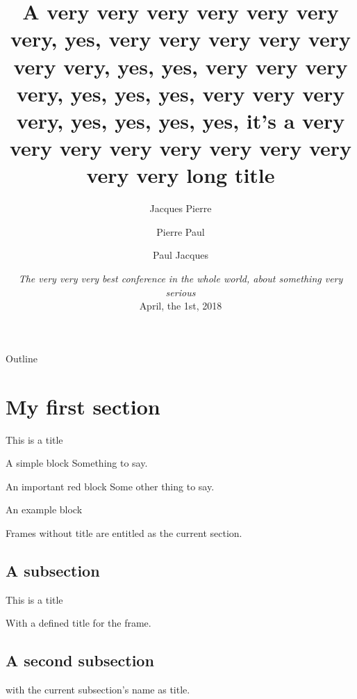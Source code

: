 \documentclass[aspectratio=169]{ISAE-Beamer}
\title[Short title]{A very very very very very very very, yes, very very very very very very very, yes, yes, very very very very, yes, yes, yes, very very very very, yes, yes, yes, yes, it's a very very very very very very very very very very long title}
\institute[ISAE, ONERA]
{\inst{1}ISAE-SUPAERO, Toulouse \and \inst{2}ONERA, Toulouse}
\author[JP, PP, PJ]{Jacques Pierre\inst{1} \and Pierre Paul\inst{2} \and Paul Jacques\inst{2}}
\date[THE Conf, 04/01/18]{\textit{The very very very best conference in the whole world, about something very serious}\\ April, the 1st, 2018}
\begin{document}
\maketitle

\begin{frame}{Outline}

\tableofcontents

\end{frame}

\section{My first section}
\begin{frame}{This is a title}

\begin{block}{A simple block}
Something to say.
\end{block}

\begin{alertblock}{An important red block}
Some other thing to say.
\end{alertblock}

\begin{example}
An example block
\end{example}

\end{frame}

\begin{frame}

Frames without title are entitled as the current section.

\end{frame}

\subsection{A subsection}
\begin{frame}{This is a title}

With a defined title for the frame.

\end{frame}

\subsection{A second subsection}
\begin{frame}

with the current subsection's name as title.

\end{frame}
\end{document}
